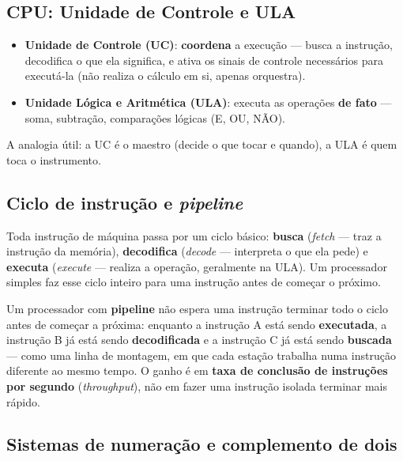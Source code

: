 \subsection{CPU: Unidade de Controle e ULA}

\begin{conceito}
\begin{itemize}
\item \textbf{Unidade de Controle (UC)}: \textbf{coordena} a execução ---
busca a instrução, decodifica o que ela significa, e ativa os sinais de
controle necessários para executá-la (não realiza o cálculo em si, apenas
orquestra).
\item \textbf{Unidade Lógica e Aritmética (ULA)}: executa as operações
\textbf{de fato} --- soma, subtração, comparações lógicas (E, OU, NÃO).
\end{itemize}
A analogia útil: a UC é o maestro (decide o que tocar e quando), a ULA é
quem toca o instrumento.
\end{conceito}

\subsection{Ciclo de instrução e \textit{pipeline}}

\begin{conceito}
Toda instrução de máquina passa por um ciclo básico:
\textbf{busca} (\textit{fetch} --- traz a instrução da memória),
\textbf{decodifica} (\textit{decode} --- interpreta o que ela pede) e
\textbf{executa} (\textit{execute} --- realiza a operação, geralmente na
ULA). Um processador simples faz esse ciclo inteiro para uma instrução
antes de começar o próximo.
\end{conceito}

\begin{conceito}
Um processador com \textbf{pipeline} não espera uma instrução terminar
todo o ciclo antes de começar a próxima: enquanto a instrução A está sendo
\textbf{executada}, a instrução B já está sendo \textbf{decodificada} e a
instrução C já está sendo \textbf{buscada} --- como uma linha de montagem,
em que cada estação trabalha numa instrução diferente ao mesmo tempo. O
ganho é em \textbf{taxa de conclusão de instruções por segundo}
(\textit{throughput}), não em fazer uma instrução isolada terminar mais
rápido.
\end{conceito}

\subsection{Sistemas de numeração e complemento de dois}

